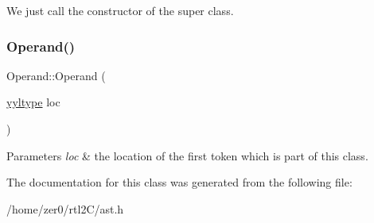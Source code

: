 We just call the constructor of the super class. \mbox{\label{class_operand_aa015348a08a68d9dc2e1d87a20161dc9}} 
\subsubsection{\texorpdfstring{Operand()}{Operand()}\hspace{0.1cm}{\footnotesize\ttfamily [2/2]}}
{\footnotesize\ttfamily Operand\+::\+Operand (\begin{DoxyParamCaption}\item[{\hyperlink{structyyltype}{yyltype}}]{loc }\end{DoxyParamCaption})\hspace{0.3cm}{\ttfamily [inline]}}


\begin{DoxyParams}{Parameters}
{\em loc} & the location of the first token which is part of this class. \\
\hline
\end{DoxyParams}


The documentation for this class was generated from the following file\+:\begin{DoxyCompactItemize}
\item 
/home/zer0/rtl2\+C/ast.\+h\end{DoxyCompactItemize}
